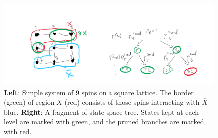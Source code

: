 \begin{figure}
    \centering
    \includegraphics[width=\textwidth]{sketches/lattice.png}
    \caption{\textbf{Left}: Simple system of 9 spins on a square lattice. The border (green) of region $X$ (red) consists of those spins interacting with $\overline{X}$ blue. \textbf{Right}: A fragment of state space tree. States kept at each level are marked with green, and the pruned branches are marked with red.}
    \label{fig:lattice-and-border}
\end{figure}

